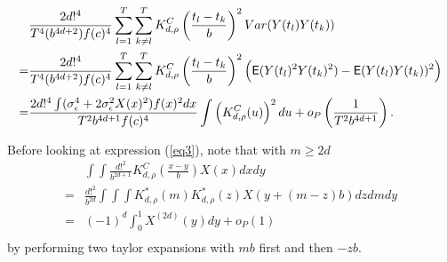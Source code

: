 \begin{equation}
\begin{split}
&\frac{2d!^4 }{T^4 (b^{4d+2})f(c)^4} \sum_{l=1}^T \sum_{k \neq l}^T  K_{d,\rho}^{C} \left( \frac{t_{l}-t_{k}}{b}\right)^2 Var( Y(t_{l}) Y(t_{k}))  \\
=& \frac{2d!^4 }{T^4 (b^{4d+2})f(c)^4} \sum_{l=1}^T \sum_{k \neq l}^T  K_{d,\rho}^{C} \left(\frac{t_{l}-t_{k}}{b} \right)^2 \left( \mathop{\mbox{\sf E}}(Y(t_{l})^2 Y(t_{k})^2) - \mathop{\mbox{\sf E}}(Y(t_{l}) Y(t_{k}))^2 \right) \\ 
=& \frac{2d!^4  \int (\sigma_{\epsilon}^4 + 2\sigma_{\epsilon}^2 X(x)^2)  f(x)^2 dx}{T^2 b^{4d+1} f(c)^4} \int\left(  K_{d,\rho}^{C}(u)  \right)^2 du + o_P \left(\frac{1}{T^2 b^{4d+1}}\right).
\end{split}
\end{equation}
%

Before looking at expression (\ref{eq3}), note that with $m\geq 2d$
\begin{equation}
\begin{split}
&\int \int \frac{ d!^2 }{ b^{2d+1} } K_{d,\rho}^{C} \left(\frac{x-y}{b} \right) X(x)  dx dy  \\
=& \frac{ d!^2 }{ b^{2d} } \int \int \int K_{d,\rho}^*\left( m \right) K_{d,\rho}^*\left( z \right)  X(y+(m-z)b) dz dm dy \\
=&(-1)^d \int_0^1  X^{(2d)}(y)  dy + o_P(1)\\
\end{split}
\end{equation}
by performing two taylor expansions with $mb$ first and then $-zb$. 

